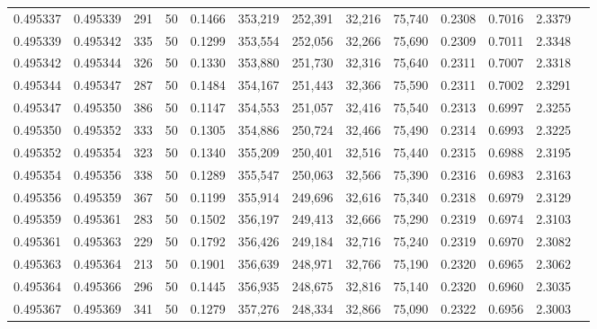 \begin{tabular}{rrrrrrrrrrrrr}
0.495337 & 0.495339 &   291 &  50 &                                     0.1466 & 353,219 & 252,391 &  32,216 &  75,740 & 0.2308 & 0.7016 & 2.3379 \\
0.495339 & 0.495342 &   335 &  50 &                                     0.1299 & 353,554 & 252,056 &  32,266 &  75,690 & 0.2309 & 0.7011 & 2.3348 \\
0.495342 & 0.495344 &   326 &  50 &                                     0.1330 & 353,880 & 251,730 &  32,316 &  75,640 & 0.2311 & 0.7007 & 2.3318 \\
0.495344 & 0.495347 &   287 &  50 &                                     0.1484 & 354,167 & 251,443 &  32,366 &  75,590 & 0.2311 & 0.7002 & 2.3291 \\
0.495347 & 0.495350 &   386 &  50 &                                     0.1147 & 354,553 & 251,057 &  32,416 &  75,540 & 0.2313 & 0.6997 & 2.3255 \\
0.495350 & 0.495352 &   333 &  50 &                                     0.1305 & 354,886 & 250,724 &  32,466 &  75,490 & 0.2314 & 0.6993 & 2.3225 \\
0.495352 & 0.495354 &   323 &  50 &                                     0.1340 & 355,209 & 250,401 &  32,516 &  75,440 & 0.2315 & 0.6988 & 2.3195 \\
0.495354 & 0.495356 &   338 &  50 &                                     0.1289 & 355,547 & 250,063 &  32,566 &  75,390 & 0.2316 & 0.6983 & 2.3163 \\
0.495356 & 0.495359 &   367 &  50 &                                     0.1199 & 355,914 & 249,696 &  32,616 &  75,340 & 0.2318 & 0.6979 & 2.3129 \\
0.495359 & 0.495361 &   283 &  50 &                                     0.1502 & 356,197 & 249,413 &  32,666 &  75,290 & 0.2319 & 0.6974 & 2.3103 \\
0.495361 & 0.495363 &   229 &  50 &                                     0.1792 & 356,426 & 249,184 &  32,716 &  75,240 & 0.2319 & 0.6970 & 2.3082 \\
0.495363 & 0.495364 &   213 &  50 &                                     0.1901 & 356,639 & 248,971 &  32,766 &  75,190 & 0.2320 & 0.6965 & 2.3062 \\
0.495364 & 0.495366 &   296 &  50 &                                     0.1445 & 356,935 & 248,675 &  32,816 &  75,140 & 0.2320 & 0.6960 & 2.3035 \\
0.495367 & 0.495369 &   341 &  50 &                                     0.1279 & 357,276 & 248,334 &  32,866 &  75,090 & 0.2322 & 0.6956 & 2.3003 \\

\end{tabular}
